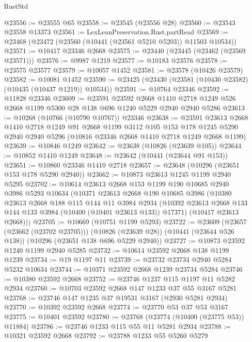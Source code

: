 \begin{lexlean}{RustStd}
\begin{coremodule}
@23556 := @23555 @65
@23558 := @23545 (@23556 @28)
@23560 := @23543 @23558 @13373
@23561 := LexLeanPreservation.Rust.partRead
@23569 := @23468 (@23472 (@23560 (@10441 (@23561 @5210 @5203)) @11503 @10534))
@23571 := @10417 @23346 @2668
@23575 := @23440 (@23445 (@23462 (@23569 @23571)))
@23576 := @9987 @1219
@23577 := @10183 @23576
@23578 := @23575 @23577
@23579 := @10057 @1452
@23581 := @23578 (@10426 @23579)
@23582 := @10081 @1452
@23590 := @23425 (@23430 (@23581 (@10430 @23582) (@10435 (@10437 @1219)) @10534))
@23591 := @10764 @23346
@23592 := @11828 @23346
@23609 := @23591
    @23592
    @2668
    @1410
    @2718
    @1249
    @526
    @2668
    @1199
    @5300
    @28
    @138
    @696
    @1240
    @5229
    @2940
    @2940
    @5286
@23613 := @10268 (@10766 (@10790 @10767)) @23346
@23638 := @23591
    @23613
    @2668
    @1410
    @2718
    @1249
    @91
    @2668
    @1199
    @3112
    @105
    @153
    @178
    @1245
    @5290
    @2940
    @2940
    @5296
    (@10816 @23346 @2668 @1410 @2718 @1249 @2668 @1199)
@23639 := @10846 @1249
@23642 := @23638 (@10826 (@23639 @105))
@23644 := @10852 @1410 @1249
@23648 := @23642 (@10441 (@23644 @91 @153))
@23651 := @10860 @23346 @1410 @2718
@23657 := @23648 (@10296 (@23651 @153 @178 @5290 @2940))
@23662 := @10873 @23613 @1245 @1199 @2940 @5295
@23702 := @10614
    @23613
    @2668
    @153
    @1199
    @190
    @10685
    @2940
    @3986
    @5293
    @10634
    (@10371
      @23613
      @2668
      @190
      @10685
      @3986
      (@10380
        @23613
        @2668
        @188
        @115
        @144
        @11
        @3984
        @2934
        (@10392 @23613 @2668 @133 @144 @133 @3984 (@10400 (@10401 @23613 @133)) @17371)
        (@10417 @23613 @2668)))
@23705 := @10669 (@10751 @1199 @5293)
@23722 := @23609
    (@23657 (@23662 (@23702 @23705)))
    (@10826 (@23639 @28))
    (@10441 (@23644 @526 @138))
    (@10296 (@23651 @138 @696 @5229 @2940))
@23727 := @10873 @23592 @1240 @1199 @2940 @5285
@23732 := @10614 @23592 @2668 @138 @1199 @1239
@23734 := @19 @1197 @11
@23739 := @23732 @23734 @2940 @5284 @5232 @10634
@23744 := @10371 @23592 @2668 @1239 @23734 @5284
@23746 := @10380 @23592 @2668
@23752 := @23746 @1237 @115 @1197 @11 @5282 @2934
@23760 := @10703 @23592 @2668 @147 @1233 @37 @55 @3167 @5281
@23768 := @23746 @147 @1235 @37 @19531 @3167 (@2930 @5281 @2934)
@23770 := @10392 @23592 @2668
@23774 := @23770 @53 @37 @53 @3167
@23775 := @10401 @23592
@23780 := @23768 (@23774 (@10400 (@23775 @53)) @11884)
@23786 := @23746 @1233 @115 @55 @11 @5281 @2934
@23788 := @10321 @23592 @2668
@23792 := @23788 @1233 @55 @5260 @5279

\end{coremodule}
\end{lexlean}
